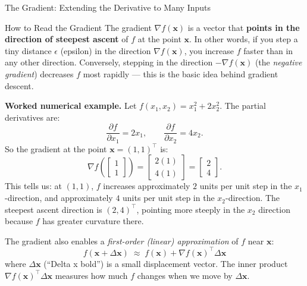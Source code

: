 \documentclass[aspectratio=169,10pt]{beamer}
\newcommand{\x}{\mathbf{x}}
\begin{document}
\begin{frame}[allowframebreaks]{The Gradient: Extending the Derivative to Many Inputs}
  \framebreak

  \begin{alertblock}{How to Read the Gradient}
    The gradient $\nabla f(\x)$ is a vector that \textbf{points in the
    direction of steepest ascent} of $f$ at the point $\x$.  In other
    words, if you step a tiny distance $\epsilon$ (epsilon) in the
    direction $\nabla f(\x)$, you increase $f$ faster than in any other
    direction.  Conversely, stepping in the direction $-\nabla f(\x)$
    (the \emph{negative gradient}) decreases $f$ most rapidly --- this
    is the basic idea behind gradient descent.
  \end{alertblock}

  \medskip
  \textbf{Worked numerical example.}
  Let $f(x_1, x_2) = x_1^2 + 2x_2^2$.
  The partial derivatives are:
  \[
    \frac{\partial f}{\partial x_1} = 2x_1, \qquad
    \frac{\partial f}{\partial x_2} = 4x_2.
  \]
  So the gradient at the point $\x = (1, 1)^\top$ is:
  \[
    \nabla f\!\left(\begin{bmatrix}1\\1\end{bmatrix}\right)
    = \begin{bmatrix}2(1)\\4(1)\end{bmatrix}
    = \begin{bmatrix}2\\4\end{bmatrix}.
  \]
  This tells us: at $(1,1)$, $f$ increases approximately $2$ units per
  unit step in the $x_1$-direction, and approximately $4$ units per unit
  step in the $x_2$-direction.  The steepest ascent direction is
  $(2,4)^\top$, pointing more steeply in the $x_2$ direction because $f$
  has greater curvature there.

  \medskip
  The gradient also enables a \emph{first-order (linear) approximation}
  of $f$ near $\x$:
  \[
    f(\x + \Delta\x)
    \;\approx\;
    f(\x) + \nabla f(\x)^\top \Delta\x
  \]
  where $\Delta\x$ (``Delta x bold'') is a small displacement vector.
  The inner product $\nabla f(\x)^\top \Delta\x$ measures how much $f$
  changes when we move by $\Delta\x$.

\end{frame}
\end{document}
